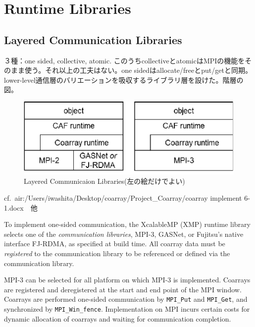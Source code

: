 \section{Runtime Libraries}\label{sec:runtime}

\subsection{Layered Communication Libraries}

３種：one sided, collective, atomic. このうちcollectiveとatomicはMPIの機能をそのまま使う。それ以上の工夫はない。one sidedはallocate/freeとput/getと同期。lower-level通信層のバリエーションを吸収するライブラリ層を設けた。階層の図。

\begin{figure}[tbh]
  \begin{center}
  \includegraphics[scale=1.0]{figs/layer.pdf}
  \caption{Layered Communicaion Libraries(左の絵だけでよい)}\label{fig:layer}
  \end{center}
\end{figure}

cf.\ air:/Users/iwashita/Desktop/coarray/Project\_Coarray/coarray implement 6-1.docx　他


To implement one-sided communication, the XcalableMP (XMP) runtime library selects one of the 
{\em communication libraries}, MPI-3, GASNet, or Fujitsu’s native interface FJ-RDMA, 
as specified at build time. All coarray data must be {\em registered} to the communication 
library to be referenced or defined via the communication library.

MPI-3 can be selected for all platform on which MPI-3 is implemented. Coarrays are 
registered and deregistered at the start and end point of the MPI window. 
Coarrays are performed one-sided communication by {\tt MPI\_Put} and {\tt MPI\_Get}, 
and synchronized by {\tt MPI\_Win\_fence}. 
Implementation on MPI incurs certain costs for dynamic allocation of coarrays and 
waiting for communication completion.

